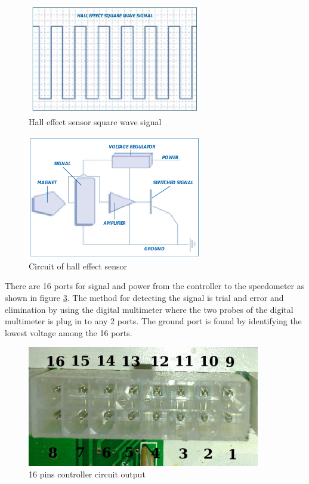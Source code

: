 \begin{figure} [htb]
	\centering
	\includegraphics[width=3in]{images/hall_effect_signals.jpg}
	\caption{Hall effect sensor square wave signal \citep{counterpoint31}}
	\label{im:hall_signal}
\end{figure}

\begin{figure} [htb]
	\centering
	\includegraphics[width=3in]{images/hall_sensor_circuit.png}
	\caption{Circuit of hall effect sensor \citep{counterpoint31}}
	\label{im:hall_circuit}
\end{figure}

There are 16 ports for signal and power from the controller to the speedometer as shown in figure \ref{im:16pin}. The method for detecting the signal is trial and error and elimination by using the digital multimeter where the two probes of the digital multimeter is plug in to any 2 ports. The ground port is found by identifying the lowest voltage among the 16 ports.

\begin{figure} [htb]
	\centering
	\includegraphics[width=4in]{images/16pin.jpg}
	\caption{16 pins controller circuit output}
	\label{im:16pin}
\end{figure}

